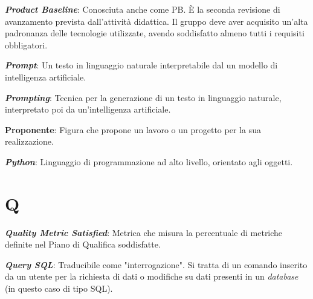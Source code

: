 \documentclass[5pt]{article}
\begin{document}
\begin{flushleft}
\textbf{\textit{Product Baseline}}: Conosciuta anche come PB. È la seconda revisione di avanzamento prevista dall'attività didattica. Il gruppo deve aver acquisito un'alta padronanza delle tecnologie utilizzate, avendo soddisfatto almeno tutti i requisiti obbligatori.\newline

\textbf{\textit{Prompt}}: Un testo in linguaggio naturale interpretabile dal un modello di intelligenza artificiale.\newline

\textbf{\textit{Prompting}}: Tecnica per la generazione di un testo in linguaggio naturale, interpretato poi da un'intelligenza artificiale.\newline

\textbf{Proponente}: Figura che propone un lavoro o un progetto per la sua realizzazione. \newline

\textbf{\textit{Python}}: Linguaggio di programmazione ad alto livello, orientato agli oggetti.

\end{flushleft}

\pagebreak

\section*{Q}
\begin{flushleft}
	
\textbf{\textit{Quality Metric Satisfied}}: Metrica che misura la percentuale di metriche definite nel Piano di Qualifica soddisfatte.\newline

\textbf{\textit{Query SQL}}: Traducibile come "interrogazione". Si tratta di un comando inserito da un utente per la richiesta di dati o modifiche su dati presenti in un \textit{database} (in questo caso di tipo SQL).

\end{flushleft}

\pagebreak
\end{document}

